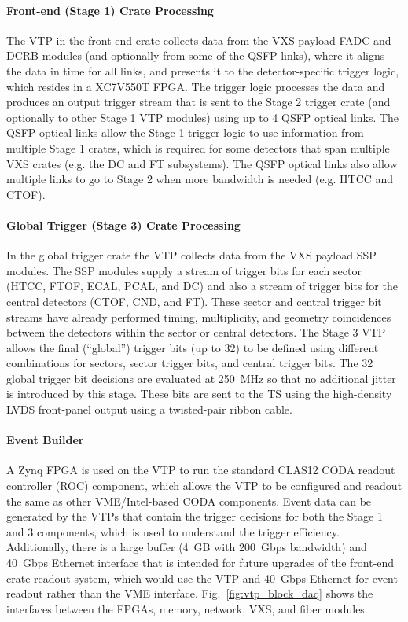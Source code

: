 \paragraph{Front-end (Stage 1) Crate Processing}
The VTP in the front-end crate collects data from the VXS payload FADC and DCRB modules (and optionally from some of the QSFP links), where it aligns the data in time for all links, and presents it to the detector-specific trigger logic, which resides in a XC7V550T FPGA. The trigger logic processes the data and produces an output trigger stream that is sent to the Stage 2 trigger crate (and optionally to other Stage 1 VTP modules) using up to 4 QSFP optical links. The QSFP optical links allow the Stage 1 trigger logic to use information from multiple Stage 1 crates, which is required for some detectors that span multiple VXS crates (e.g. the DC and FT subsystems). The QSFP optical links also allow multiple links to go to Stage 2 when more bandwidth is needed (e.g. HTCC and CTOF).

\paragraph{Global Trigger (Stage 3) Crate Processing}
In the global trigger crate the VTP collects data from the VXS payload SSP modules. The SSP modules supply a stream of trigger bits for each sector (HTCC, FTOF, ECAL, PCAL, and DC) and also a stream of trigger bits for the central detectors (CTOF, CND, and FT). These sector and central trigger bit streams have already performed timing, multiplicity, and geometry coincidences between the detectors within the sector or central detectors. The Stage 3 VTP allows the final (``global'') trigger bits (up to 32) to be defined using different combinations for sectors, sector trigger bits, and central trigger bits. The 32 global trigger bit decisions are evaluated at 250~MHz so that no additional jitter is introduced by this stage. These bits are sent to the TS using the high-density LVDS front-panel output using a twisted-pair ribbon cable.

\paragraph{Event Builder}
A Zynq FPGA is used on the VTP to run the standard CLAS12 CODA readout controller (ROC) component, which allows the VTP to be configured and readout the same as other VME/Intel-based CODA components. Event data can be generated by the VTPs that contain the trigger decisions for both the Stage 1 and 3 components, which is used to understand the trigger efficiency. Additionally, there is a large buffer (4~GB with 200~Gbps bandwidth) and 40~Gbps Ethernet interface that is intended for future upgrades of the front-end crate readout system, which would use the VTP and 40~Gbps Ethernet for event readout rather than the VME interface. Fig.~\ref{fig:vtp_block_daq} shows the interfaces between the FPGAs, memory, network, VXS, and fiber modules.

